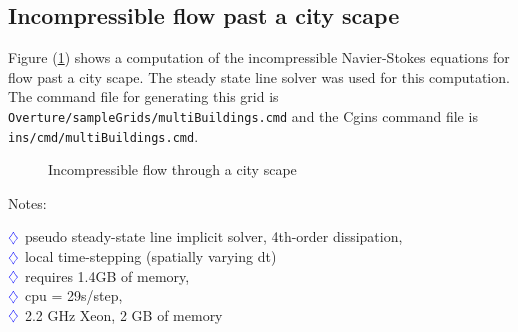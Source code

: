 \subsection{Incompressible flow past a city scape}\label{sec:flowPastBuildings}

Figure (\ref{fig:cityScape}) shows a computation of the incompressible Navier-Stokes
equations for flow past a city scape. The steady state line solver was used for this
computation. The command file for generating this grid is {\tt Overture/sampleGrids/multiBuildings.cmd}
and the Cgins command file is {\tt ins/cmd/multiBuildings.cmd}.


{
\newcommand{\figWidthd}{8.0cm}
\newcommand{\trimfig}[2]{\trimPlotb{#1}{#2}{.0}{.0}{.000}{.00}}
\newcommand{\figWidtha}{10cm}
\newcommand{\trimfiga}[2]{\trimPlotb{#1}{#2}{.0}{.0}{.0}{.0}}
\begin{figure}[hbt]
\begin{center}
\end{center}
\caption{Incompressible flow through a city scape} \label{fig:cityScape}
\end{figure}
}



Notes:
\begin{flushleft}
 $\color{blue}\diamondsuit$ pseudo steady-state line implicit solver, 4th-order dissipation, \\
 $\color{blue}\diamondsuit$ local time-stepping (spatially varying dt)\\
 $\color{blue}\diamondsuit$ requires 1.4GB of memory, \\
 $\color{blue}\diamondsuit$ cpu = 29s/step, \\
 $\color{blue}\diamondsuit$ 2.2 GHz Xeon, 2 GB of memory
\end{flushleft}


